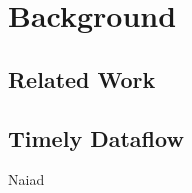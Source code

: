 \chapter{Background}\label{ch:background}

\section{Related Work}

\section{Timely Dataflow}

Naiad \cite{naiad}
